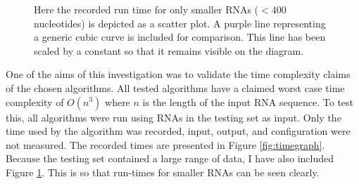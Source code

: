 \documentclass[12pt, a4paper]{article}
\begin{document}
\begin{figure}
\begin{center}
\end{center}
\caption{Here the recorded run time for only smaller RNAs ($< 400$ nucleotides) is depicted as a scatter plot. A purple line representing a generic cubic curve is included for comparison. This line has been scaled by a constant so that it remains visible on the diagram.}
\label{fig:timegraphsmall}
\end{figure}

One of the aims of this investigation was to validate the time complexity claims of the chosen algorithms. All tested algorithms have a claimed worst case time complexity of $O(n^3)$ where $n$ is the length of the input RNA sequence. To test this, all algorithms were run using RNAs in the testing set as input. Only the time used by the algorithm was recorded, input, output, and configuration were not measured. The recorded times are presented in Figure \ref{fig:timegraph}. Because the testing set contained a large range of data, I have also included Figure \ref{fig:timegraphsmall}. This is so that run-times for smaller RNAs can be seen clearly.
\end{document}

